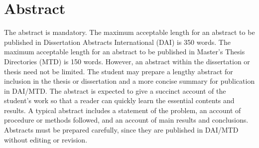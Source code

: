 \chapter*{Abstract}
\begin{doublespace}
    The abstract is mandatory.
    The maximum acceptable length for an abstract to be published in Dissertation Abstracts International (DAI) is 350 words. 
    The maximum acceptable length for an abstract to be published in Master’s Thesis Directories (MTD) is 150 words. 
    However, an abstract within the dissertation or thesis need not be limited. 
    The student may prepare a lengthy abstract for inclusion in the thesis or dissertation and a more concise summary for publication in DAI/MTD.
    The abstract is expected to give a succinct account of the student's work so that a reader can quickly learn the essential contents and results. 
    A typical abstract includes a statement of the problem, an account of procedure or methods followed, and an account of main results and conclusions.
    Abstracts must be prepared carefully, since they are published in DAI/MTD without editing or revision.
\end{doublespace}